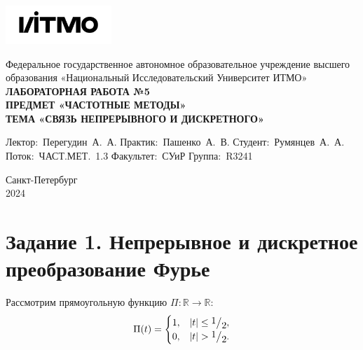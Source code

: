 \documentclass[a4paper, 12pt]{article}
\newcommand{\frc}[2]{\raisebox{2pt}{$#1$}\big/\raisebox{-3pt}{$#2$}}
\begin{document}
    \begin{titlepage}

        \begin{center}
        \includegraphics[width=0.3\textwidth]{itmo.png} %
        \vfill

        Федеральное государственное автономное образовательное учреждение высшего образования
        «Национальный Исследовательский Университет ИТМО»\\

        \vfill
        {\large\bf ЛАБОРАТОРНАЯ РАБОТА №5}\\
        {\large\bf ПРЕДМЕТ «ЧАСТОТНЫЕ МЕТОДЫ»}\\
        {\large\bf ТЕМА «СВЯЗЬ НЕПРЕРЫВНОГО И ДИСКРЕТНОГО»}
        \vfill

        \begin{flushright}
            \begin{minipage}{.45\textwidth}
            {
                \hbox{Лектор: Перегудин А. А.}
                \hbox{Практик: Пашенко А. В.}
                \hbox{Студент: Румянцев А. А.}
                \hbox{Поток: ЧАСТ.МЕТ. 1.3}
                \hbox{}
                \hbox{Факультет: СУиР}
                \hbox{Группа: R3241}
            }
            \end{minipage}
        \end{flushright}

        \vfill

        Санкт-Петербург\\
        2024
        \end{center}
    \end{titlepage}

    \tableofcontents

    \newpage
    \section{Задание 1. Непрерывное и дискретное преобразование Фурье}
    Рассмотрим прямоугольную функцию $\Pi:\mathbb{R}\rightarrow\mathbb{R}$:
    $$\Pi(t)=
    \begin{cases}
        1, & |t| \leq \frc{1}{2},\\
        0, & |t| > \frc{1}{2}.
    \end{cases}$$
\end{document}
